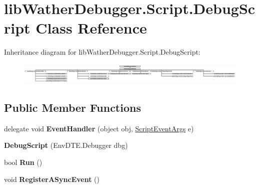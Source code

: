 \hypertarget{classlib_wather_debugger_1_1_script_1_1_debug_script}{\section{lib\+Wather\+Debugger.\+Script.\+Debug\+Script Class Reference}
\label{classlib_wather_debugger_1_1_script_1_1_debug_script}
}
Inheritance diagram for lib\+Wather\+Debugger.\+Script.\+Debug\+Script\+:\begin{figure}[H]
\begin{center}
\leavevmode
\includegraphics[height=1.007712cm]{classlib_wather_debugger_1_1_script_1_1_debug_script}
\end{center}
\end{figure}
\subsection*{Public Member Functions}
\begin{DoxyCompactItemize}
\item 
\hypertarget{classlib_wather_debugger_1_1_script_1_1_debug_script_a91649303df7aa5d57cbb4f0e1857bc26}{delegate void {\bfseries Event\+Handler} (object obj, \hyperlink{classlib_wather_debugger_1_1_script_1_1_script_event_1_1_script_event_args}{Script\+Event\+Args} e)}\label{classlib_wather_debugger_1_1_script_1_1_debug_script_a91649303df7aa5d57cbb4f0e1857bc26}

\item 
\hypertarget{classlib_wather_debugger_1_1_script_1_1_debug_script_a47fed3394e0417d990ee56b4ff361840}{{\bfseries Debug\+Script} (Env\+D\+T\+E.\+Debugger dbg)}\label{classlib_wather_debugger_1_1_script_1_1_debug_script_a47fed3394e0417d990ee56b4ff361840}

\item 
\hypertarget{classlib_wather_debugger_1_1_script_1_1_debug_script_a1cc819da1b39454363b91b16c5991e92}{bool {\bfseries Run} ()}\label{classlib_wather_debugger_1_1_script_1_1_debug_script_a1cc819da1b39454363b91b16c5991e92}

\item 
\hypertarget{classlib_wather_debugger_1_1_script_1_1_debug_script_ae73a268b8de0febcf3632a0df7ec6915}{void {\bfseries Register\+A\+Sync\+Event} ()}\label{classlib_wather_debugger_1_1_script_1_1_debug_script_ae73a268b8de0febcf3632a0df7ec6915}

\end{DoxyCompactItemize}
